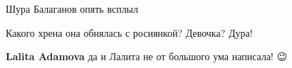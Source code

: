 \begin{itemize}
 
Шура Балаганов опять всплыл

 
Какого хрена она обнялась с росиянкой? Девочка? Дура!

\begin{itemize}
 
\textbf{Lalita Adamova} да и Лалита не от большого ума написала! 😉
\end{itemize}

\end{itemize}

